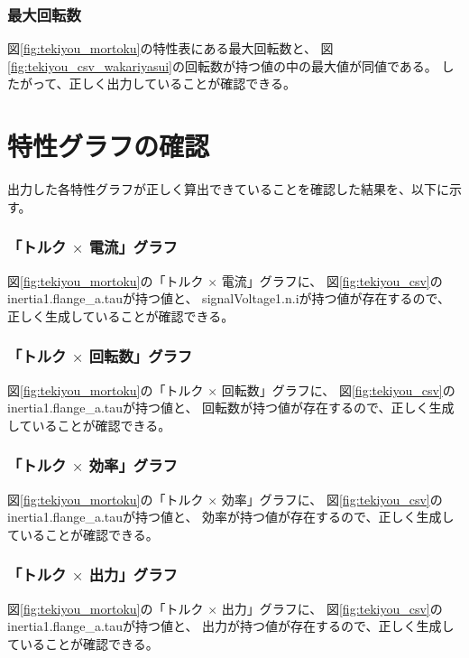 \subsubsection{最大回転数}
図\ref{fig:tekiyou_mortoku}の特性表にある最大回転数と、
図\ref{fig:tekiyou_csv_wakariyasui}の回転数が持つ値の中の最大値が同値である。
したがって、正しく出力していることが確認できる。

\section{特性グラフの確認}
出力した各特性グラフが正しく算出できていることを確認した結果を、以下に示す。

\subsubsection{「トルク $\times$ 電流」グラフ}
図\ref{fig:tekiyou_mortoku}の「トルク $\times$ 電流」グラフに、
図\ref{fig:tekiyou_csv}のinertia1.flange\_a.tauが持つ値と、
signalVoltage1.n.iが持つ値が存在するので、正しく生成していることが確認できる。

\subsubsection{「トルク $\times$ 回転数」グラフ}
図\ref{fig:tekiyou_mortoku}の「トルク $\times$ 回転数」グラフに、
図\ref{fig:tekiyou_csv}のinertia1.flange\_a.tauが持つ値と、
回転数が持つ値が存在するので、正しく生成していることが確認できる。

\subsubsection{「トルク $\times$ 効率」グラフ}
図\ref{fig:tekiyou_mortoku}の「トルク $\times$ 効率」グラフに、
図\ref{fig:tekiyou_csv}のinertia1.flange\_a.tauが持つ値と、
効率が持つ値が存在するので、正しく生成していることが確認できる。

\subsubsection{「トルク $\times$ 出力」グラフ}
図\ref{fig:tekiyou_mortoku}の「トルク $\times$ 出力」グラフに、
図\ref{fig:tekiyou_csv}のinertia1.flange\_a.tauが持つ値と、
出力が持つ値が存在するので、正しく生成していることが確認できる。



